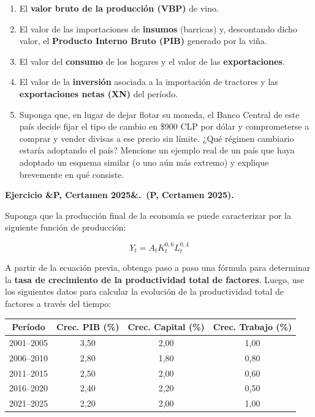 \documentclass[11pt]{article}
\newcounter{ejercicio}
\newcommand{\ejercicio}[1][]{%
  \stepcounter{ejercicio}%
  \bigskip\noindent\textbf{Ejercicio \arabic{ejercicio}\ifx&#1&\relax.\else\ (#1).\fi}\ %
}
\newenvironment{partes}
  {\begin{enumerate}[label=(\alph*), leftmargin=1.5cm]}
  {\end{enumerate}}
\newenvironment{tabladatos}
  {\begin{center}}
  {\end{center}}
\begin{document}
\begin{partes}
  \item El \textbf{valor bruto de la producción (VBP)} de vino.
  \item El valor de las importaciones de \textbf{insumos} (barricas) y, descontando dicho valor, el \textbf{Producto Interno Bruto (PIB)} generado por la viña.
  \item El valor del \textbf{consumo} de los hogares y el valor de las \textbf{exportaciones}.
  \item El valor de la \textbf{inversión} asociada a la importación de tractores y las \textbf{exportaciones netas (XN)} del período.
  \item Suponga que, en lugar de dejar flotar su moneda, el Banco Central de este país decide fijar el tipo de cambio en \$900 CLP por dólar y comprometerse a comprar y vender divisas a ese precio sin límite. ¿Qué régimen cambiario estaría adoptando el país? Mencione un ejemplo real de un país que haya adoptado un esquema similar (o uno aún más extremo) y explique brevemente en qué consiste.
\end{partes}




\ejercicio[P, Certamen 2025]
Suponga que la producción final de la economía se puede caracterizar por la siguiente función de producción:

\[
Y_t = A_t K_t^{0,6} L_t^{0,4}
\]

\noindent
A partir de la ecuación previa, obtenga paso a paso una fórmula para determinar la \textbf{tasa de crecimiento de la productividad total de factores}. Luego, use los siguientes datos para calcular la evolución de la productividad total de factores a través del tiempo:

\begin{tabladatos}
\begin{tabular}{cccc}
\hline\hline
\textbf{Período} & \textbf{Crec. PIB (\%)} & \textbf{Crec. Capital (\%)} & \textbf{Crec. Trabajo (\%)} \\
\hline
2001--2005 & 3,50 & 2,00 & 1,00 \\
2006--2010 & 2,80 & 1,80 & 0,80 \\
2011--2015 & 2,50 & 2,00 & 0,60 \\
2016--2020 & 2,40 & 2,20 & 0,50 \\
2021--2025 & 2,20 & 2,00 & 1,00 \\
\hline\hline
\end{tabular}
\end{tabladatos}
\end{document}
